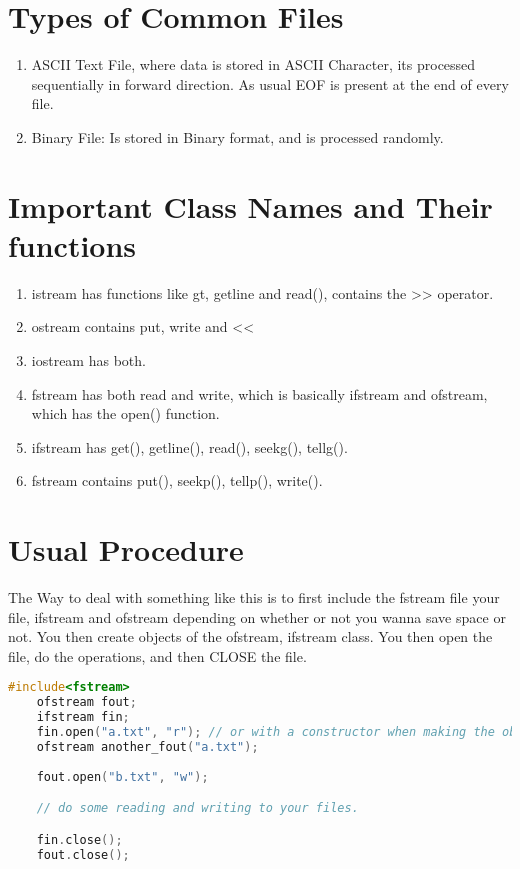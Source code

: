 \documentclass[11pt]{article}
\begin{document}
\clearpage
\tableofcontents
\clearpage

\section{Types of Common Files}
\begin{enumerate}
    \item ASCII Text File, where data is stored in ASCII Character, its processed sequentially in forward direction. As usual EOF is present at the end of every file. 
    \item Binary File: Is stored in Binary format, and is processed randomly. 
\end{enumerate}

\section{Important Class Names and Their functions}
\begin{enumerate}
	\item istream has functions like gt, getline and read(), contains the >> operator. 
	\item ostream contains put, write and << 
	\item iostream has both. 
	\item fstream has both read and write, which is basically ifstream and ofstream, which has the open() function. 
	\item ifstream has get(), getline(), read(), seekg(), tellg(). 
	\item fstream contains put(), seekp(), tellp(), write().
\end{enumerate}

\section{Usual Procedure}
The Way to deal with something like this is to first include the fstream file your file, ifstream and ofstream depending on whether or not you wanna save space or not. You then create objects of the ofstream, ifstream class. You then open the file, do the operations, and then CLOSE the file. 

\begin{lstlisting}[language = C++]
	#include<fstream>
	ofstream fout;
	ifstream fin;
	fin.open("a.txt", "r"); // or with a constructor when making the object. 
	ofstream another_fout("a.txt");
	
	fout.open("b.txt", "w");

	// do some reading and writing to your files. 

	fin.close();
	fout.close();

\end{lstlisting}
\end{document}
